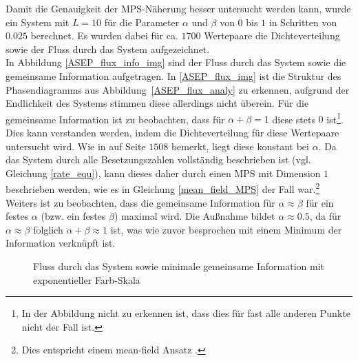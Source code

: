 \documentclass[10pt,a4paper]{report}
\begin{document}
Damit die Genauigkeit der MPS-Näherung besser untersucht werden kann, wurde ein System mit $L=10$ für die Parameter $\alpha$ und $\beta$  von $0$ bis $1$ in Schritten von $0.025$ berechnet. Es wurden dabei für ca. $1700$ Wertepaare die Dichteverteilung sowie der Fluss durch das System aufgezeichnet.\\

In Abbildung \ref{ASEP_flux_info_img} sind der Fluss durch das System sowie die gemeinsame Information aufgetragen. In \ref{ASEP_flux_img} ist die Struktur des Phasendiagramms aus Abbildung~\ref{ASEP_flux_analy} zu erkennen, aufgrund der Endlichkeit des Systems stimmen diese allerdings nicht überein. 
Für die gemeinsame Information ist zu beobachten, dass für $\alpha+\beta=1$ diese stets $0$ ist\footnote{In der Abbildung nicht zu erkennen ist, dass dies für fast alle anderen Punkte nicht der Fall ist.}. Dies kann verstanden werden, indem die Dichteverteilung für diese Wertepaare untersucht wird. Wie in \cite{ASEP} auf Seite $1508$ bemerkt, liegt diese konstant bei $\alpha$. Da das System durch alle Besetzungszahlen vollständig beschrieben ist (vgl. Gleichung \ref{rate_equ}), kann dieses daher durch einen MPS mit Dimension $1$ beschrieben werden, wie es in Gleichung \ref{mean_field_MPS} der Fall war.\footnote{Dies entspricht einem mean-field Ansatz \cite{Area_law}.} Weiters ist zu beobachten, dass die gemeinsame Information für $\alpha\approx\beta$ für ein festes $\alpha$ (bzw. ein festes $\beta$) maximal wird. Die Außnahme bildet $\alpha\approx0.5$, da für $\alpha\approx\beta$ folglich $\alpha+\beta\approx 1$ ist, was wie zuvor besprochen mit einem Minimum der Information verknüpft ist.\\

\begin{figure}\label{ASEP_flux_info_img}
\centering
{}
\label{ASEP_flux&info_img}
\caption{Fluss durch das System sowie minimale gemeinsame Information mit exponentieller Farb-Skala}
\end{figure}
\end{document}
